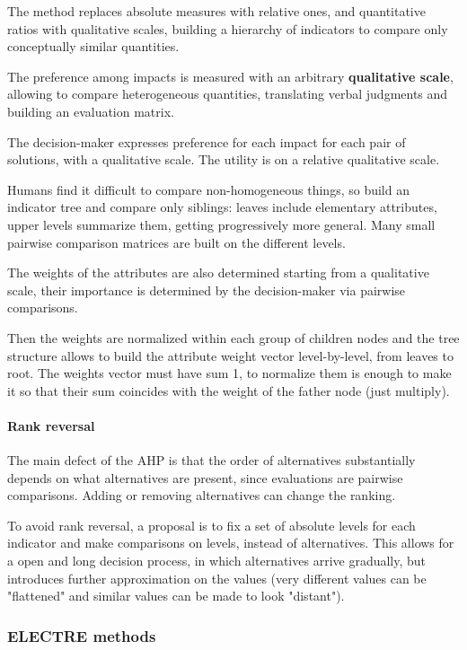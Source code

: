The method replaces absolute measures with relative ones, and quantitative ratios with qualitative scales, building a hierarchy of indicators to compare only conceptually similar quantities.

The preference among impacts is measured with an arbitrary \textbf{qualitative scale}, allowing to compare heterogeneous quantities, translating verbal judgments and building an evaluation matrix. 

The decision-maker expresses preference for each impact for each pair of solutions, with a qualitative scale. The utility is on a relative qualitative scale.

Humans find it difficult to compare non-homogeneous things, so build an indicator tree and compare only siblings: leaves include elementary attributes, upper levels summarize them, getting progressively more general. Many small pairwise comparison matrices are built on the different levels.

The weights of the attributes are also determined starting from a qualitative scale, their importance is determined by the decision-maker via pairwise comparisons.

Then the weights are normalized within each group of children nodes and the tree structure allows to build the attribute weight vector level-by-level, from leaves to root. The weights vector must have sum 1, to normalize them is enough to make it so that their sum coincides with the weight of the father node (just multiply).

\paragraph{Rank reversal} The main defect of the AHP is that the order of alternatives substantially depends on what alternatives are present, since evaluations are pairwise comparisons. Adding or removing alternatives can change the ranking.

To avoid rank reversal, a proposal is to fix a set of absolute levels for each indicator and make comparisons on levels, instead of alternatives. This allows for a open and long decision process, in which alternatives arrive gradually, but introduces further approximation on the values (very different values can be "flattened" and similar values can be made to look "distant").

\subsubsection{ELECTRE methods}

